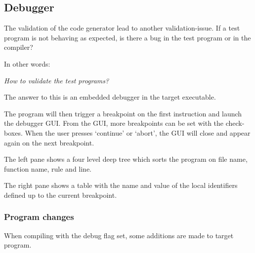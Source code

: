 \subsection{Debugger}\label{debugger}
The validation of the code generator lead to another validation-issue.
If a test program is not behaving as expected, is there a bug in the test program or in the compiler?

In other words:

\textit{How to validate the test programs?}

The answer to this is an embedded debugger in the target executable.


The program will then trigger a breakpoint on the first instruction and launch the debugger GUI.
From the GUI, more breakpoints can be set with the check-boxes.
When the user presses `continue' or `abort', the GUI will close and appear again on the next breakpoint.

The left pane shows a four level deep tree which sorts the program on file name, function name, rule and line.

The right pane shows a table with the name and value of the local identifiers defined up to the current breakpoint.

\subsubsection{Program changes}
When compiling with the debug flag set, some additions are made to target program.

